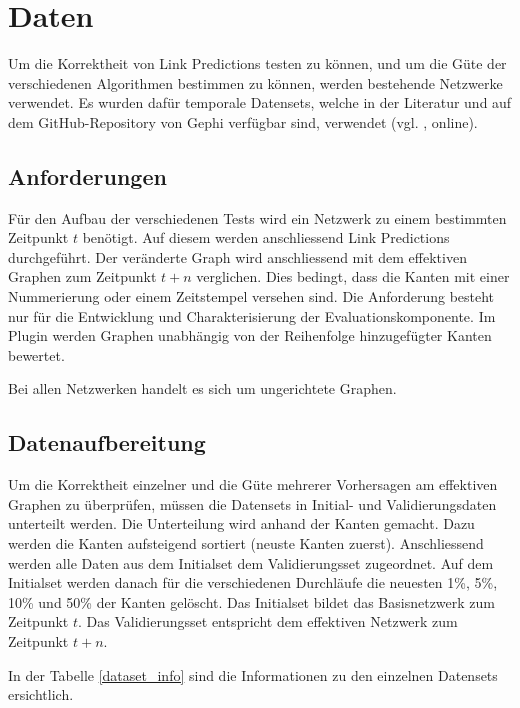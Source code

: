 \chapter{Daten}
\label{daten}
Um die Korrektheit von Link Predictions testen zu können, und um die Güte der verschiedenen Algorithmen bestimmen zu können, werden bestehende Netzwerke verwendet.
Es wurden dafür temporale Datensets, welche in der Literatur und auf dem GitHub-Repository von Gephi verfügbar sind, verwendet (vgl. \citeauthor{moll_datasets_2018} \citeyear{moll_datasets_2018}, online).

\section{Anforderungen}
Für den Aufbau der verschiedenen Tests wird ein Netzwerk zu einem bestimmten Zeitpunkt $t$ benötigt.
Auf diesem werden anschliessend Link Predictions durchgeführt.
Der veränderte Graph wird anschliessend mit dem effektiven Graphen zum Zeitpunkt $t + n$ verglichen.
Dies bedingt, dass die Kanten mit einer Nummerierung oder einem Zeitstempel versehen sind.
Die Anforderung besteht nur für die Entwicklung und Charakterisierung der Evaluationskomponente.
Im Plugin werden Graphen unabhängig von der Reihenfolge hinzugefügter Kanten bewertet.

Bei allen Netzwerken handelt es sich um ungerichtete Graphen.

\section{Datenaufbereitung}
Um die Korrektheit einzelner und die Güte mehrerer Vorhersagen am effektiven Graphen zu überprüfen, müssen die Datensets in Initial- und Validierungsdaten unterteilt werden.
Die Unterteilung wird anhand der Kanten gemacht. Dazu werden die Kanten aufsteigend sortiert (neuste Kanten zuerst).
Anschliessend werden alle Daten aus dem Initialset dem Validierungsset zugeordnet. Auf dem Initialset werden danach für die verschiedenen Durchläufe die neuesten 1\%, 5\%, 10\% und 50\% der Kanten gelöscht. Das Initialset bildet das Basisnetzwerk zum Zeitpunkt $t$.
Das Validierungsset entspricht dem effektiven Netzwerk zum Zeitpunkt $t + n$.

In der Tabelle \ref{dataset_info} sind die Informationen zu den einzelnen Datensets ersichtlich.

